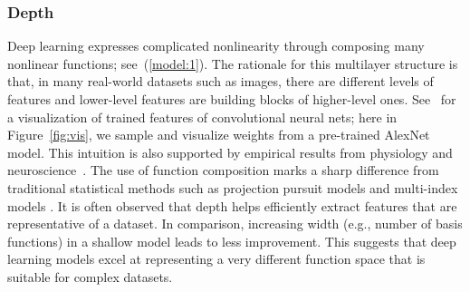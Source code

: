 \subsubsection{Depth}
Deep learning expresses complicated nonlinearity through composing many nonlinear functions; see~(\ref{model:1}). The rationale for this multilayer structure is that, in many real-world datasets such as images, there are different levels of features and lower-level features are building blocks of higher-level ones. See~\cite{yosinski2015understanding} for a visualization of trained features of convolutional neural nets; here in Figure~\ref{fig:vis}, we sample and visualize weights from a pre-trained AlexNet model. This intuition is also supported by empirical results from physiology and neuroscience~\citep{hubel1962receptive, abbasi2018deeptune}. The use of function composition marks a sharp difference from traditional statistical methods such as projection pursuit models \citep{friedman1981projection} and multi-index models \citep{li1991sliced, cook2007fisher}. It is often observed that depth helps efficiently extract features that are representative of a dataset. In comparison, increasing width (e.g., number of basis functions) in a shallow model leads to less improvement. This suggests that deep learning models excel at representing a very different function space that is suitable for complex datasets.




